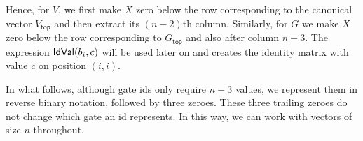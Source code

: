 Hence, for $V$, we first make $X$ zero below
the row corresponding to the canonical vector $V_{\mathsf{top}}$ and then extract its
$(n-2)$th column. Similarly, for $G$ we make $X$ zero below the row corresponding to
$G_{\mathsf{top}}$ and also after column $n-3$. The expression $\mathsf{IdVal}(b_i, c)$ will be used later on and creates the identity matrix with value $c$ on position $(i,i)$. 

In what follows, although gate ids only require $n-3$ values, we represent them in reverse binary notation, followed by three zeroes.
These three trailing zeroes do not change which gate an id represents. In this way, we can work with vectors of size $n$ throughout.

%
%
